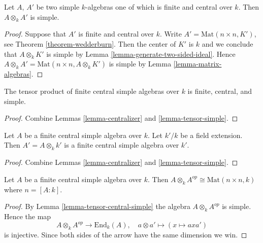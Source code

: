 \begin{lemma}
\label{lemma-tensor-simple}
Let $A$, $A'$ be two simple $k$-algebras one of which is finite and central
over $k$. Then $A \otimes_k A'$ is simple.
\end{lemma}

\begin{proof}
Suppose that $A'$ is finite and central over $k$.
Write $A' = \text{Mat}(n \times n, K')$, see
Theorem \ref{theorem-wedderburn}.
Then the center of $K'$ is $k$ and we conclude that
$A \otimes_k K'$ is simple by
Lemma \ref{lemma-generate-two-sided-ideal}.
Hence $A \otimes_k A' = \text{Mat}(n \times n, A \otimes_k K')$ is simple
by Lemma \ref{lemma-matrix-algebras}.
\end{proof}

\begin{lemma}
\label{lemma-tensor-central-simple}
The tensor product of finite central simple algebras over $k$ is finite,
central, and simple.
\end{lemma}

\begin{proof}
Combine Lemmas \ref{lemma-centralizer} and \ref{lemma-tensor-simple}.
\end{proof}

\begin{lemma}
\label{lemma-base-change}
Let $A$ be a finite central simple algebra over $k$.
Let $k'/k$ be a field extension. Then $A' = A \otimes_k k'$ is
a finite central simple algebra over $k'$.
\end{lemma}

\begin{proof}
Combine Lemmas \ref{lemma-centralizer} and \ref{lemma-tensor-simple}.
\end{proof}

\begin{lemma}
\label{lemma-inverse}
Let $A$ be a finite central simple algebra over $k$.
Then $A \otimes_k A^{op} \cong \text{Mat}(n \times n, k)$
where $n = [A : k]$.
\end{lemma}

\begin{proof}
By Lemma \ref{lemma-tensor-central-simple} the algebra $A \otimes_k A^{op}$
is simple. Hence the map
$$
A \otimes_k A^{op} \longrightarrow \text{End}_k(A),\quad
a \otimes a' \longmapsto (x \mapsto axa')
$$
is injective. Since both sides of the arrow have the same dimension
we win.
\end{proof}





